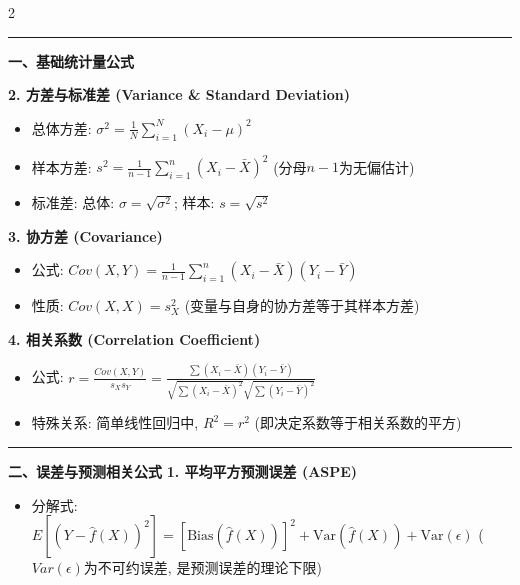 \documentclass[9pt,a4paper]{article} %
\newcommand{\mysection}[1]{\vspace{0.5em}\hrule\vspace{0.3em}\noindent\textbf{\large #1}\vspace{0.1em}}
\begin{document}

\begin{multicols}{2}
\RaggedRight %





\mysection{一、基础统计量公式}


\textbf{2. 方差与标准差 (Variance \& Standard Deviation)}
\begin{itemize}
    \item 总体方差: $\sigma^2 = \frac{1}{N} \sum_{i=1}^{N} (X_i - \mu)^2$
    \item 样本方差: $s^2 = \frac{1}{n-1} \sum_{i=1}^{n} (X_i - \bar{X})^2$ (分母$n-1$为无偏估计)
    \item 标准差: 总体: $\sigma = \sqrt{\sigma^2}$; 样本: $s = \sqrt{s^2}$
\end{itemize}

\textbf{3. 协方差 (Covariance)}
\begin{itemize}
    \item 公式: $Cov(X,Y) = \frac{1}{n-1} \sum_{i=1}^{n} (X_i - \bar{X})(Y_i - \bar{Y})$
    \item 性质: $Cov(X,X) = s_X^2$ (变量与自身的协方差等于其样本方差)
\end{itemize}

\textbf{4. 相关系数 (Correlation Coefficient)}
\begin{itemize}
    \item 公式: $r = \frac{Cov(X,Y)}{s_X s_Y} = \frac{\sum (X_i - \bar{X})(Y_i - \bar{Y})}{\sqrt{\sum (X_i - \bar{X})^2} \sqrt{\sum (Y_i - \bar{Y})^2}}$     \item 特殊关系: 简单线性回归中, $R^2 = r^2$ (即决定系数等于相关系数的平方)
\end{itemize}

\mysection{二、误差与预测相关公式}
\textbf{1. 平均平方预测误差 (ASPE)}
\begin{itemize}
    \item 分解式: $E[(Y - \hat{f}(X))^2] = [\text{Bias}(\hat{f}(X))]^2 + \text{Var}(\hat{f}(X)) + \text{Var}(\epsilon)$ ($Var(\epsilon)$为不可约误差, 是预测误差的理论下限)
\end{itemize}


\end{multicols}
\end{document}
